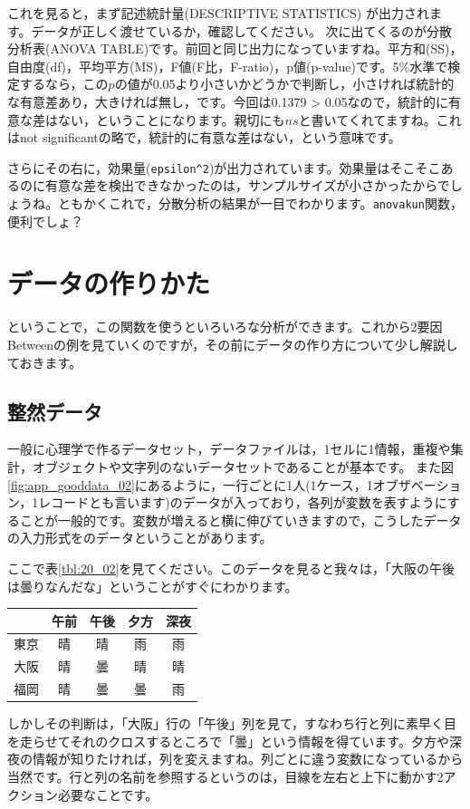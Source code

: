 \documentclass{ltjbook}
\begin{document}
これを見ると，まず記述統計量(DESCRIPTIVE STATISTICS) が出力されます。データが正しく渡せているか，確認してください。
次に出てくるのが分散分析表(ANOVA TABLE)です。前回と同じ出力になっていますね。平方和(SS)，自由度(df)，平均平方(MS)，F値(F比，F-ratio)，p値(p-value)です。5\%水準で検定するなら，この$p$の値が0.05より小さいかどうかで判断し，小さければ統計的な有意差あり，大きければ無し，です。今回は0.1379 > 0.05なので，統計的に有意な差はない，ということになります。親切にも$ns$と書いてくれてますね。これはnot significantの略で，統計的に有意な差はない，という意味です。

さらにその右に，効果量(\verb|epsilon^2|)が出力されています。効果量はそこそこあるのに有意な差を検出できなかったのは，サンプルサイズが小さかったからでしょうね。ともかくこれで，分散分析の結果が一目でわかります。\verb|anovakun|関数，便利でしょ？

\section{データの作りかた}
\label{MakingData}
ということで，この関数を使うといろいろな分析ができます。これから2要因Betweenの例を見ていくのですが，その前にデータの作り方について少し解説しておきます。
\subsection{整然データ}
一般に心理学で作るデータセット，データファイルは，1セルに1情報，重複や集計，オブジェクトや文字列のないデータセットであることが基本です。
また図\ref{fig:app_gooddata_02}にあるように，一行ごとに1人(1ケース，1オブザベーション，1レコードとも言います)のデータが入っており，各列が変数を表すようにすることが一般的です。変数が増えると横に伸びていきますので，こうしたデータの入力形式をのデータということがあります。

ここで表\ref{tbl:20_02}を見てください。このデータを見ると我々は，「大阪の午後は曇りなんだな」ということがすぐにわかります。
\begin{center}
	\begin{tabular}{c|cccc}
		   & 午前 & 午後 & 夕方 & 深夜 \\\hline
		東京 & 晴  & 晴  & 雨  & 雨  \\
		大阪 & 晴  & 曇  & 晴  & 晴  \\
		福岡 & 晴  & 曇  & 曇  & 雨  \\\hline
	\end{tabular}
	\label{tbl:20_02}
\end{center}
しかしその判断は，「大阪」行の「午後」列を見て，すなわち行と列に素早く目を走らせてそれのクロスするところで「曇」という情報を得ています。夕方や深夜の情報が知りたければ，列を変えますね。列ごとに違う変数になっているから当然です。行と列の名前を参照するというのは，目線を左右と上下に動かす2アクション必要なことです。
\end{document}
